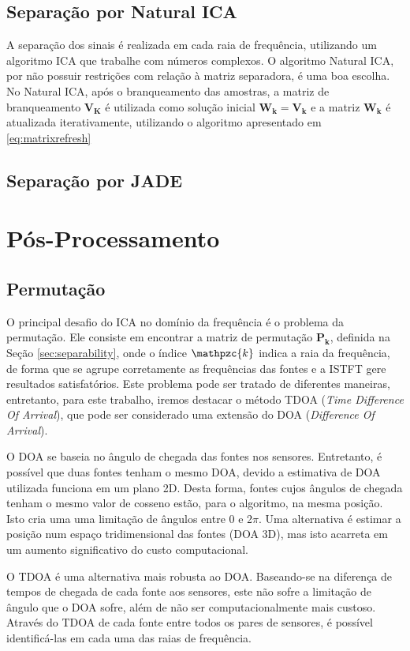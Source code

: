     \subsection{Separação por Natural ICA}
    A separação dos sinais é realizada em cada raia de frequência, utilizando um algoritmo ICA que trabalhe com números complexos. O algoritmo Natural ICA, por não possuir restrições com relação à matriz separadora, é uma boa escolha.
    No Natural ICA, após o branqueamento das amostras, a matriz de branqueamento $\mathbf{V_K}$ é utilizada como solução inicial $\mathbf{W_k = V_k}$ e a matriz $\mathbf{W_k}$ é atualizada iterativamente, utilizando o algoritmo apresentado em \ref{eq:matrixrefresh}
    
    \subsection{Separação por JADE}
    
    
\section{Pós-Processamento}
    \subsection{Permutação}
    O principal desafio do ICA no domínio da frequência é o problema da permutação. Ele consiste em encontrar a matriz de permutação $\mathbf{P_k}$, definida na Seção \ref{sec:separability}, onde o índice $\mathpzc{k}$ indica a raia da frequência, de forma que se agrupe corretamente as frequências das fontes e a ISTFT gere resultados satisfatórios.
    Este problema pode ser tratado de diferentes maneiras, entretanto, para este trabalho, iremos destacar o método TDOA (\textit{Time Difference Of Arrival}), que pode ser considerado uma extensão do DOA (\textit{Difference Of Arrival}).
    
    O DOA se baseia no ângulo de chegada das fontes nos sensores. Entretanto, é possível que duas fontes tenham o mesmo DOA, devido a estimativa de DOA utilizada funciona em um plano 2D. Desta forma, fontes cujos ângulos de chegada tenham o mesmo valor de cosseno estão, para o algoritmo, na mesma posição. Isto cria uma uma limitação de ângulos entre 0 e 2$\pi$. Uma alternativa é estimar a posição num espaço tridimensional das fontes (DOA 3D), mas isto acarreta em um aumento significativo do custo computacional.
    
    O TDOA é uma alternativa mais robusta ao DOA. Baseando-se na diferença de tempos de chegada de cada fonte aos sensores, este não sofre a limitação de ângulo que o DOA sofre, além de não ser computacionalmente mais custoso. Através do TDOA de cada fonte entre todos os pares de sensores, é possível identificá-las em cada uma das raias de frequência.
    
